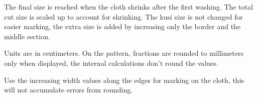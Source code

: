 The final size is reached when the cloth shrinks after the first
washing. The total cut size is scaled up to account for shrinking. The
kusi size is not changed for easier marking, the extra size is added by
increasing only the border and the middle section.

Units are in centimeters. On the pattern, fractions are rounded to
millimeters only when displayed, the internal calculations don't round
the values.

Use the increasing width values along the edges for marking on the
cloth, this will not accumulate errors from rounding.

